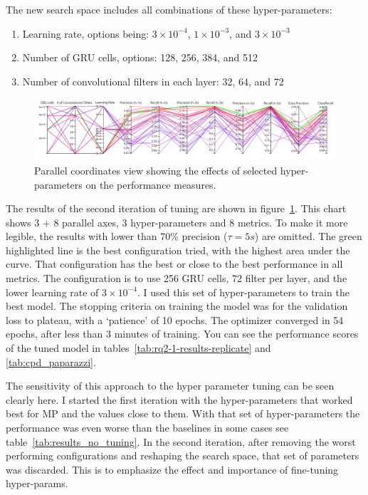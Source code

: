 The new search space includes all combinations of these hyper-parameters:

\begin{enumerate}
    \item Learning rate, options being: $3\times10^{-4}$, $1\times10^{-3}$, and $3\times10^{-3}$
    \item Number of GRU cells, options: 128, 256, 384, and 512
    \item Number of convolutional filters in each layer: 32, 64, and 72
\end{enumerate}

\begin{figure}
    \centering
    \includegraphics[width=\columnwidth]{RQ3-5_charts/refined_prec_recall_white_background.png}
    \caption{Parallel coordinates view showing the effects of selected hyper-parameters on the performance measures.}
    \label{fig:precision_recall_parallel_coordinates}
\end{figure}
The results of the second iteration of tuning are shown in figure~\ref{fig:precision_recall_parallel_coordinates}. This chart shows 3 + 8 parallel axes, 3 hyper-parameters and 8 metrics. To make it more legible, the results with lower than 70\% precision ($\tau = 5s$) are omitted.
The green highlighted line is the best configuration tried, with the highest area under the curve. That configuration has the best or close to the best performance in all metrics. The configuration is to use 256 GRU cells, 72 filter per layer, and the lower learning rate of $3\times10^{-4}$.
I used this set of hyper-parameters to train the best model. The stopping criteria on training the model was for the validation loss to plateau, with a `patience' of 10 epochs. The optimizer converged in 54 epochs, after less than 3 minutes of training.
You can see the performance scores of the tuned model in tables~\ref{tab:rq2-1-results-replicate} and \ref{tab:cpd_paparazzi}.

The sensitivity of this approach to the hyper parameter tuning can be seen clearly here. I started the first iteration with the hyper-parameters that worked best for MP and the values close to them. With that set of hyper-parameters the performance was even worse than the baselines in some cases see table~\ref{tab:results_no_tuning}.
In the second iteration, after removing the worst performing configurations and reshaping the search space, that set of parameters was discarded. 
This is to emphasize the effect and importance of fine-tuning hyper-params.

